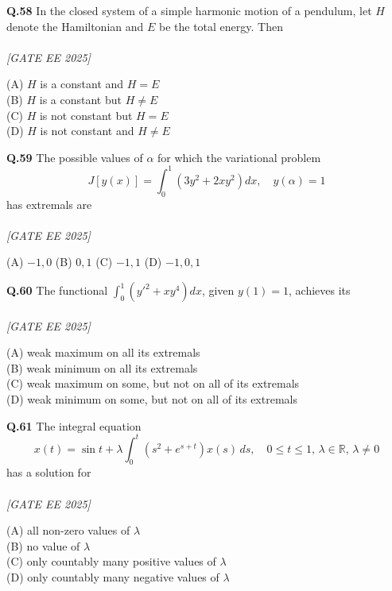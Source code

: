 \documentclass[11pt]{article}
\begin{document}
\begin{flushleft}
\textbf{Q.58} In the closed system of a simple harmonic motion of a pendulum, let $H$ denote the Hamiltonian and $E$ be the total energy. Then \\
\\[1ex] \textit{[GATE EE 2025]}

(A) $H$ is a constant and $H = E$ \\
(B) $H$ is a constant but $H \neq E$ \\
(C) $H$ is not constant but $H = E$ \\
(D) $H$ is not constant and $H \neq E$
\end{flushleft}

\begin{flushleft}
\textbf{Q.59} The possible values of $\alpha$ for which the variational problem
\[
J[y(x)] = \int_0^1 \left( 3y^2 + 2x y^2 \right) dx, \quad y(\alpha) = 1
\]
has extremals are \\
\\[1ex] \textit{[GATE EE 2025]}

(A) $-1, 0$ \hspace{2em} (B) $0, 1$ \hspace{2em} (C) $-1, 1$ \hspace{2em} (D) $-1, 0, 1$
\end{flushleft}

\begin{flushleft}
\textbf{Q.60} The functional $\displaystyle \int_0^1 (y'^2 + x y^4) dx$, given $y(1) = 1$, achieves its \\
\\[1ex] \textit{[GATE EE 2025]}

(A) weak maximum on all its extremals \\
(B) weak minimum on all its extremals \\
(C) weak maximum on some, but not on all of its extremals \\
(D) weak minimum on some, but not on all of its extremals
\end{flushleft}

\begin{flushleft}
\textbf{Q.61} The integral equation
\[
x(t) = \sin t + \lambda \int_0^t \left( s^2 + e^{s+t} \right) x(s) \, ds, \quad 0 \leq t \leq 1, \, \lambda \in \mathbb{R}, \, \lambda \neq 0
\]
has a solution for \\
\\[1ex] \textit{[GATE EE 2025]}

(A) all non-zero values of $\lambda$ \\
(B) no value of $\lambda$ \\
(C) only countably many positive values of $\lambda$ \\
(D) only countably many negative values of $\lambda$
\end{flushleft}
\end{document}

